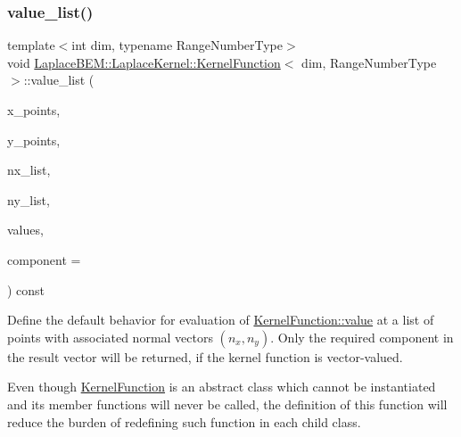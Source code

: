 \subsubsection{\texorpdfstring{value\+\_\+list()}{value\_list()}}
{\footnotesize\ttfamily template$<$int dim, typename Range\+Number\+Type$>$ \\
void \hyperlink{classLaplaceBEM_1_1LaplaceKernel_1_1KernelFunction}{Laplace\+B\+E\+M\+::\+Laplace\+Kernel\+::\+Kernel\+Function}$<$ dim, Range\+Number\+Type $>$\+::value\+\_\+list (\begin{DoxyParamCaption}\item[{const std\+::vector$<$ Point$<$ dim $>$$>$ \&}]{x\+\_\+points,  }\item[{const std\+::vector$<$ Point$<$ dim $>$$>$ \&}]{y\+\_\+points,  }\item[{const std\+::vector$<$ Tensor$<$ 1, dim $>$$>$ \&}]{nx\+\_\+list,  }\item[{const std\+::vector$<$ Tensor$<$ 1, dim $>$$>$ \&}]{ny\+\_\+list,  }\item[{std\+::vector$<$ Range\+Number\+Type $>$ \&}]{values,  }\item[{const unsigned int}]{component = {} }\end{DoxyParamCaption}) const\hspace{0.3cm}{\ttfamily [virtual]}}

Define the default behavior for evaluation of {\ttfamily \hyperlink{classLaplaceBEM_1_1LaplaceKernel_1_1KernelFunction_aee6c638a4392616e89784d7b6558dd24}{Kernel\+Function\+::value}} at a list of points with associated normal vectors $(n_x, n_y)$. Only the required {\ttfamily component} in the result vector will be returned, if the kernel function is vector-\/valued.


\begin{DoxyDescription}
\item[Note ]Even though {\ttfamily \hyperlink{classLaplaceBEM_1_1LaplaceKernel_1_1KernelFunction}{Kernel\+Function}} is an abstract class which cannot be instantiated and its member functions will never be called, the definition of this function will reduce the burden of redefining such function in each child class. 
\end{DoxyDescription}


